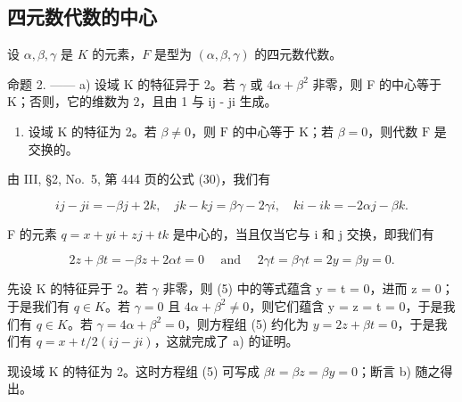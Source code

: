 \subsection{四元数代数的中心}

设 \(\alpha, \beta, \gamma\) 是 \(K\) 的元素，\(F\) 是型为 \((\alpha, \beta, \gamma)\) 的四元数代数。

命题 2. —— a) 设域 K 的特征异于 2。若 \(\gamma\) 或 \(4\alpha + \beta^{2}\) 非零，则 F 的中心等于 K；否则，它的维数为 2，且由 1 与 ij - ji 生成。

\begin{enumerate}
\def\labelenumi{\alph{enumi})}
\setcounter{enumi}{1}
\tightlist
\item
  设域 \(\mathrm{K}\) 的特征为 2。若 \(\beta \neq 0\)，则 \(\mathrm{F}\) 的中心等于 \(\mathrm{K}\)；若 \(\beta = 0\)，则代数 \(\mathrm{F}\) 是交换的。
\end{enumerate}

由 III, §2, No.~5, 第 444 页的公式 (30)，我们有

\[
i j - j i = - \beta j + 2 k, \quad j k - k j = \beta \gamma - 2 \gamma i, \quad k i - i k = - 2 \alpha j - \beta k. \tag {4}
\]

F 的元素 \(q = x + yi + zj + tk\) 是中心的，当且仅当它与 i 和 j 交换，即我们有

\[
2 z + \beta t = - \beta z + 2 \alpha t = 0 \quad \text { and } \quad 2 \gamma t = \beta \gamma t = 2 y = \beta y = 0.\tag{5}
\]

先设 K 的特征异于 2。若 \(\gamma\) 非零，则 (5) 中的等式蕴含 y = t = 0，进而 z = 0；于是我们有 \(q \in K\)。若 \(\gamma = 0\) 且 \(4\alpha + \beta^{2} \neq 0\)，则它们蕴含 y = z = t = 0，于是我们有 \(q \in K\)。若 \(\gamma = 4\alpha + \beta^{2} = 0\)，则方程组 (5) 约化为 \(y = 2z + \beta t = 0\)，于是我们有 \(q = x + t/2(ij - ji)\)，这就完成了 a) 的证明。

现设域 K 的特征为 2。这时方程组 (5) 可写成 \(\beta t = \beta z = \beta y = 0\)；断言 b) 随之得出。

